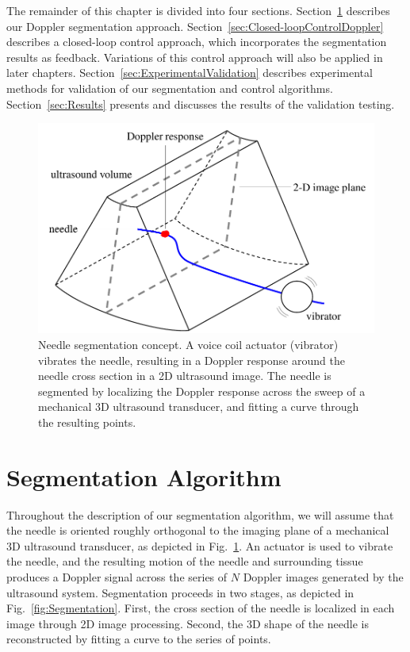 The remainder of this chapter is divided into four sections. Section~\ref{sec:Algorithms} describes our Doppler segmentation approach. Section~\ref{sec:Closed-loopControlDoppler} describes a closed-loop control approach, which incorporates the segmentation results as feedback. Variations of this control approach will also be applied in later chapters. Section~\ref{sec:ExperimentalValidation} describes experimental methods for validation of our segmentation and control algorithms. Section~\ref{sec:Results} presents and discusses the results of the validation testing.

\begin{figure}[!t]
\centering
\includegraphics[width = 0.6\columnwidth]{Images/Chapter2/SliceConcept/SliceConcept}%
\caption[3D ultrasound segmentation concept]{Needle segmentation concept. A voice coil actuator (vibrator) vibrates the needle, resulting in a Doppler response around the needle cross section in a 2D ultrasound image. The needle is segmented by localizing the Doppler response across the sweep of a mechanical 3D ultrasound transducer, and fitting a curve through the resulting points.}
\label{fig:SliceConcept}
\end{figure}

\section{Segmentation Algorithm}
\label{sec:Algorithms}
Throughout the description of our segmentation algorithm, we will assume that the needle is oriented roughly orthogonal to the imaging plane of a mechanical 3D ultrasound transducer, as depicted in Fig.~\ref{fig:SliceConcept}. An actuator is used to vibrate the needle, and the resulting motion of the needle and surrounding tissue produces a Doppler signal across the series of $N$ Doppler images generated by the ultrasound system. Segmentation proceeds in two stages, as depicted in Fig.~\ref{fig:Segmentation}. First, the cross section of the needle is localized in each image through 2D image processing. Second, the 3D shape of the needle is reconstructed by fitting a curve to the series of points.

